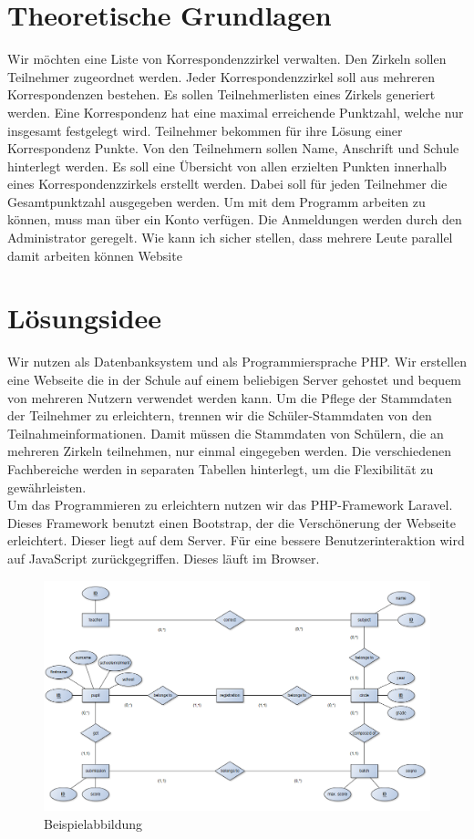 \chapter{Theoretische Grundlagen}
Wir möchten eine Liste von Korrespondenzzirkel verwalten. Den Zirkeln sollen Teilnehmer zugeordnet werden. Jeder Korrespondenzzirkel soll aus mehreren Korrespondenzen bestehen. Es sollen Teilnehmerlisten eines Zirkels generiert werden. Eine Korrespondenz hat eine maximal erreichende Punktzahl, welche nur insgesamt festgelegt wird. Teilnehmer bekommen für ihre Lösung einer Korrespondenz Punkte. Von den Teilnehmern sollen Name, Anschrift und Schule hinterlegt werden. Es soll eine Übersicht von allen erzielten Punkten innerhalb eines Korrespondenzzirkels erstellt werden. Dabei soll für jeden Teilnehmer die Gesamtpunktzahl ausgegeben werden. Um mit dem Programm arbeiten zu können, muss man über ein Konto verfügen. Die Anmeldungen werden durch den Administrator geregelt. 
Wie kann ich sicher stellen, dass mehrere Leute parallel damit arbeiten können Website

\chapter{Lösungsidee}
Wir nutzen als Datenbanksystem und als Programmiersprache PHP. Wir erstellen eine Webseite die in der Schule auf einem beliebigen Server gehostet und bequem von mehreren Nutzern verwendet werden kann. Um die Pflege der Stammdaten der Teilnehmer zu erleichtern, trennen wir die Schüler-Stammdaten von den Teilnahmeinformationen. Damit müssen die Stammdaten von Schülern, die an mehreren Zirkeln teilnehmen, nur einmal eingegeben werden. Die verschiedenen Fachbereiche werden in separaten Tabellen hinterlegt, um die Flexibilität zu gewährleisten.\\ 
Um das Programmieren zu erleichtern nutzen wir das PHP-Framework Laravel. Dieses Framework benutzt einen Bootstrap, der die Verschönerung der Webseite erleichtert. Dieser liegt auf dem Server.  Für eine bessere Benutzerinteraktion  wird auf JavaScript zurückgegriffen. Dieses läuft im Browser.\\
\begin{figure}[ht]
	\centering
	\includegraphics[scale=.55]{bilder/ER-Modell_engl.PNG}
	\caption{Beispielabbildung}
	\label{abb:beispiel}
\end{figure}
